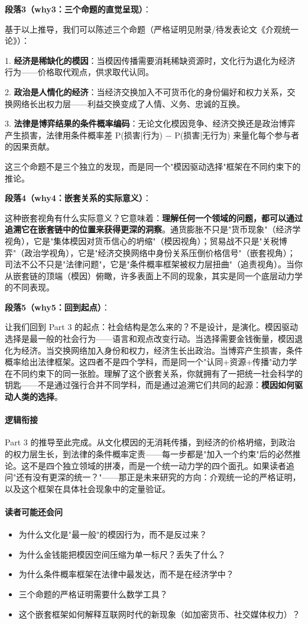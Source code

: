 \documentclass[../main.tex]{subfiles}
\begin{document}
	\textbf{段落3（why3：三个命题的直觉呈现）}：  

	基于以上推导，我们可以陈述三个命题（严格证明见附录/待发表论文《介观统一论》）：  

	1. \textbf{经济是稀缺化的模因}：当模因传播需要消耗稀缺资源时，文化行为退化为经济行为——价格取代观点，供求取代认同。  

	2. \textbf{政治是人情化的经济}：当经济交换加入不可货币化的身份偏好和权力关系，交换网络长出权力层——利益交换变成了人情、义务、忠诚的互换。  

	3. \textbf{法律是博弈结果的条件概率编码}：无论文化模因竞争、经济交换还是政治博弈产生损害，法律用条件概率差 P(损害|行为) − P(损害|无行为) 来量化每个参与者的因果贡献。  

	这三个命题不是三个独立的发现，而是同一个"模因驱动选择"框架在不同约束下的推论。

	\textbf{段落4（why4：嵌套关系的实际意义）}：  

	这种嵌套视角有什么实际意义？它意味着：\textbf{理解任何一个领域的问题，都可以通过追溯它在嵌套链中的位置来获得更深的洞察}。通货膨胀不只是"货币现象"（经济学视角），它是"集体模因对货币信心的坍缩"（模因视角）；贸易战不只是"关税博弈"（政治学视角），它是"经济交换网络中身份关系压倒价格信号"（嵌套视角）；司法不公不只是"法律问题"，它是"条件概率框架被权力层扭曲"（追责视角）。当你从嵌套链的顶端（模因）俯瞰，许多表面上不同的现象，其实是同一个底层动力学的不同表现。

	\textbf{段落5（why5：回到起点）}：  

	让我们回到 Part 3 的起点：社会结构是怎么来的？不是设计，是演化。模因驱动选择是最一般的社会行为——语言和观点改变行动。当选择需要金钱衡量，模因退化为经济。当交换网络加入身份和权力，经济生长出政治。当博弈产生损害，条件概率给出法律框架。这四者不是四个学科，而是同一个"认同+资源+传播"动力学在不同约束下的同一张脸。理解了这个嵌套关系，你就拥有了一把统一社会科学的钥匙——不是通过强行合并不同学科，而是通过追溯它们共同的起源：\textbf{模因如何驱动人类的选择}。

	\paragraph*{逻辑衔接}

	Part 3 的推导至此完成。从文化模因的无消耗传播，到经济的价格坍缩，到政治的权力层生长，到法律的条件概率定责——每一步都是"加入一个约束"后的必然推论。这不是四个独立领域的拼凑，而是一个统一动力学的四个面孔。如果读者追问"还有没有更深的统一？"——那正是未来研究的方向：介观统一论的严格证明，以及这个框架在具体社会现象中的定量验证。

	\paragraph*{读者可能还会问}
	\begin{itemize}

	\item 为什么文化是"最一般"的模因行为，而不是反过来？

	\item 为什么金钱能把模因空间压缩为单一标尺？丢失了什么？

	\item 为什么条件概率框架在法律中最发达，而不是在经济学中？

	\item 三个命题的严格证明需要什么数学工具？

	\item 这个嵌套框架如何解释互联网时代的新现象（如加密货币、社交媒体权力）？
	\end{itemize}
\end{document}
